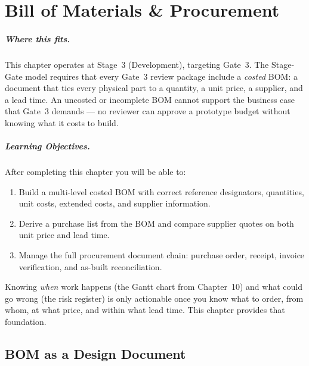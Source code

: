 
\chapter{Bill of Materials \& Procurement}
\label{ch11}

\paragraph{Where this fits.}
This chapter operates at Stage~3 (Development), targeting Gate~3.
The Stage-Gate model requires that every Gate~3 review package include a
\emph{costed} BOM: a document that ties every physical part to a quantity, a
unit price, a supplier, and a lead time.
An uncosted or incomplete BOM cannot support the business case that Gate~3
demands --- no reviewer can approve a prototype budget without knowing what it
costs to build.

\paragraph{Learning Objectives.}
After completing this chapter you will be able to:
\begin{enumerate}
  \item Build a multi-level costed BOM with correct reference designators,
        quantities, unit costs, extended costs, and supplier information.
  \item Derive a purchase list from the BOM and compare supplier quotes on both
        unit price and lead time.
  \item Manage the full procurement document chain: purchase order, receipt,
        invoice verification, and as-built reconciliation.
\end{enumerate}

Knowing \emph{when} work happens (the Gantt chart from Chapter~10) and what could go wrong (the risk register) is only actionable once you know what to order, from whom, at what price, and within what lead time. This chapter provides that foundation.

\section{BOM as a Design Document}
\label{sec:ch11-bom-design}

